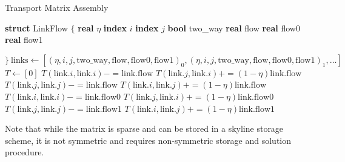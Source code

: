 \documentclass[10pt]{report}
\newcommand{\pluseq}{\ensuremath{\mathrel{+}=}}
\newcommand{\minuseq}{\ensuremath{\mathrel{-}=}}
\newcommand{\IndentedState}[1]{\State\hspace{\algorithmicindent} #1}
\begin{document}
\begin{algorithm}
  \caption{Transport Matrix Assembly}\label{TransportAssembly}
  \begin{algorithmic}[1]
    \State \textbf{struct} LinkFlow $\{$
        \IndentedState \textbf{real} $\eta$
        \IndentedState \textbf{index} $i$
        \IndentedState \textbf{index} $j$
        \IndentedState \textbf{bool} two\_way
        \IndentedState \textbf{real} flow
        \IndentedState \textbf{real} flow0
        \IndentedState \textbf{real} flow1
        
    \State  $\}\ \text{links} \gets [(\eta, i, j, \text{two\_way}, \text{flow}, \text{flow0}, \text{flow1})_0, (\eta, i, j, \text{two\_way}, \text{flow}, \text{flow0}, \text{flow1})_1, \ldots]$
    \State $T \gets [0]$
            \State $T(\text{link}.i, \text{link}.i) \minuseq \text{link.flow}$
            \State $T(\text{link}.j, \text{link}.i) \pluseq \left(1-\eta\right) \text{link.flow}$
        \Else %
            \State $T(\text{link}.j, \text{link}.j) \minuseq \text{link.flow}$
            \State $T(\text{link}.i, \text{link}.j) \pluseq \left(1-\eta\right) \text{link.flow}$
        \EndIf
      \Else
            \State $T(\text{link}.i, \text{link}.i) \minuseq \text{link.flow0}$
            \State $T(\text{link}.j, \text{link}.i) \pluseq \left(1-\eta\right) \text{link.flow0}$
        \EndIf
            \State $T(\text{link}.j, \text{link}.j) \minuseq \text{link.flow1}$
            \State $T(\text{link}.i, \text{link}.j) \pluseq \left(1-\eta\right) \text{link.flow1}$
        \EndIf
      \EndIf
    \EndFor
  \end{algorithmic}
\end{algorithm}

Note that while the matrix is sparse and can be stored in a skyline storage scheme, it is not symmetric and
requires non-symmetric storage and solution procedure.
 
\end{document}
